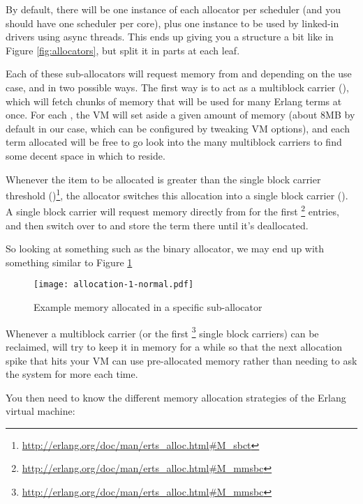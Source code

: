 \documentclass[11pt, oneside]{book}   	%
\begin{document}
By default, there will be one instance of each allocator per scheduler (and you should have one scheduler per core), plus one instance to be used by linked-in drivers using async threads. This ends up giving you a structure a bit like in Figure \ref{fig:allocators}, but split it in  parts at each leaf.

Each of these sub-allocators will request memory from  and  depending on the use case, and in two possible ways. The first way is to act as a multiblock carrier (), which will fetch chunks of memory that will be used for many Erlang terms at once. For each , the VM will set aside a given amount of memory (about 8MB by default in our case, which can be configured by tweaking VM options), and each term allocated will be free to go look into the many multiblock carriers to find some decent space in which to reside.

Whenever the item to be allocated is greater than the single block carrier threshold ()\footnote{\href{http://erlang.org/doc/man/erts\_alloc.html\#M\_sbct}{http://erlang.org/doc/man/erts\_alloc.html\#M\_sbct}}, the allocator switches this allocation into a single block carrier (). A single block carrier will request memory directly from  for the first \footnote{\href{http://erlang.org/doc/man/erts\_alloc.html\#M\_mmsbc}{http://erlang.org/doc/man/erts\_alloc.html\#M\_mmsbc}} entries, and then switch over to  and store the term there until it's deallocated.

So looking at something such as the binary allocator, we may end up with something similar to Figure \ref{fig:allocation-1-normal}

\begin{figure}
  \texttt{[image: allocation-1-normal.pdf]}%
  \caption{Example memory allocated in a specific sub-allocator}%
   \label{fig:allocation-1-normal}
\end{figure}
\FloatBarrier

Whenever a multiblock carrier (or the first \footnote{\href{http://erlang.org/doc/man/erts\_alloc.html\#M\_mmsbc}{http://erlang.org/doc/man/erts\_alloc.html\#M\_mmsbc}} single block carriers) can be reclaimed,  will try to keep it in memory for a while so that the next allocation spike that hits your VM can use pre-allocated memory rather than needing to ask the system for more each time.

You then need to know the different memory allocation strategies of the Erlang virtual machine:
\end{document}
